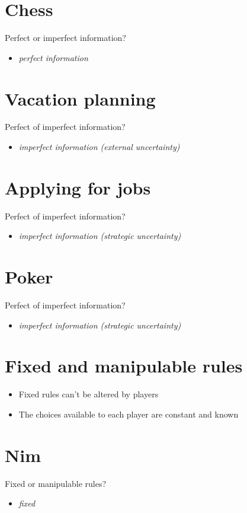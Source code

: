 \documentclass[11pt]{article}
\begin{document}
\section*{Chess}
\label{sec:org70b1bea}
Perfect or imperfect information?
\begin{itemize}
\item \emph{perfect information}
\end{itemize}

\section*{Vacation planning}
\label{sec:org03df69f}
Perfect of imperfect information?
\begin{itemize}
\item \emph{imperfect information (external uncertainty)}
\end{itemize}

\section*{Applying for jobs}
\label{sec:org0c8a075}
Perfect of imperfect information?
\begin{itemize}
\item \emph{imperfect information (strategic uncertainty)}
\end{itemize}

\section*{Poker}
\label{sec:orgbbe97e2}
Perfect of imperfect information?
\begin{itemize}
\item \emph{imperfect information (strategic uncertainty)}
\end{itemize}

\section*{Fixed and manipulable rules}
\label{sec:orgfeac593}
\begin{itemize}
\item Fixed rules can't be altered by players
\item The choices available to each player are constant and known
\end{itemize}

\section*{Nim}
\label{sec:org20cddb8}
Fixed or manipulable rules?
\begin{itemize}
\item \emph{fixed}
\end{itemize}
\end{document}
